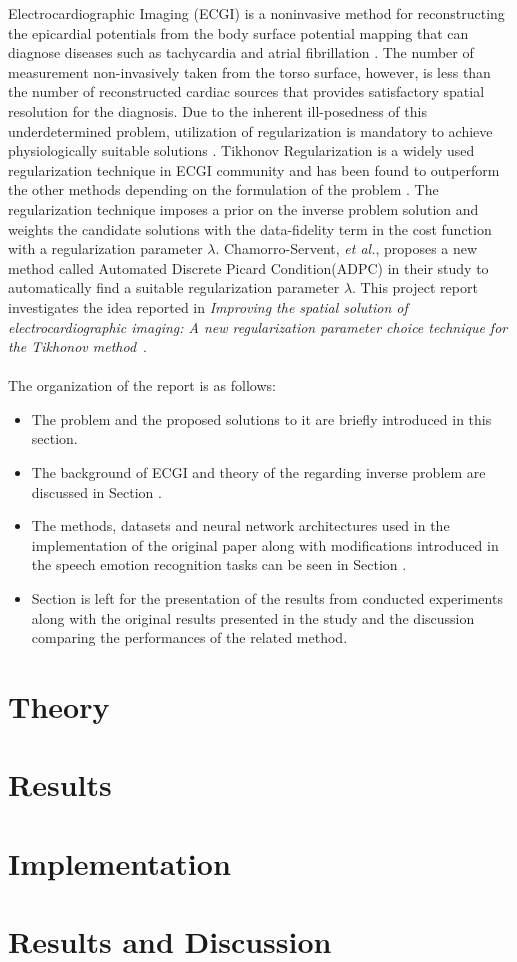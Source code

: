 \documentclass[draftcls, onecolumn, journal]{IEEEtran}
\begin{document}
Electrocardiographic Imaging (ECGI) is a noninvasive method for reconstructing the epicardial potentials from the body surface potential mapping that can diagnose diseases such as tachycardia \cite{intini2005electrocardiographic} and atrial fibrillation \cite{figuera2016regularization,schuler2017ecg}. The number of measurement non-invasively taken from the torso surface, however, is less than the number of reconstructed cardiac sources that provides satisfactory spatial resolution for the diagnosis. Due to the inherent ill-posedness of this underdetermined problem, utilization of regularization is mandatory to achieve physiologically suitable solutions \cite{milanivc2014assessment}. Tikhonov Regularization is a widely used regularization technique in ECGI community and has been found to outperform the other methods depending on the formulation of the problem \cite*{milanivc2014assessment}. The regularization technique imposes a prior on the inverse problem solution and weights the candidate solutions with the data-fidelity term in the cost function with a regularization parameter $\lambda$. Chamorro-Servent, \textit{et al.}, proposes a new method called Automated Discrete Picard Condition(ADPC) in their study \cite*{chamorro2017improving} to automatically find a suitable regularization parameter $\lambda$. 
This project report investigates the idea reported in \textit{Improving the spatial solution of electrocardiographic
imaging: A new regularization parameter choice technique for the Tikhonov method}~\cite{chamorro2017improving}.  
\\
\\
The organization of the report is as follows:
\begin{itemize}
    \item The problem and the proposed solutions to it are briefly introduced in this section.
    \item The background of ECGI and theory of the regarding inverse problem are discussed in Section .
    \item The methods, datasets and neural network architectures used in the implementation of the original paper along with modifications introduced in the speech emotion recognition tasks can be seen in Section .
    \item Section  is left for the presentation of the results from conducted experiments along with the original results presented in the study and the discussion comparing the performances of the related method.
\end{itemize}

\section{Theory}\label{sec:theory}




\section{Results}\label{sec:results}
\section{Implementation}\label{sec:implementation}
\section{Results and Discussion}\label{sec:discussion}
\end{document}
